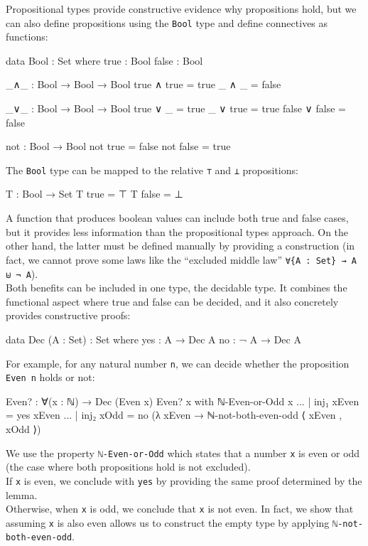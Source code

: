 Propositional types provide constructive evidence why propositions hold, but we can also define propositions using the \texttt{Bool} type and define connectives as functions:
\begin{agda}
data Bool : Set where
  true  : Bool
  false : Bool
  
_∧_ : Bool → Bool → Bool
true  ∧ true  = true
_     ∧ _     = false

_∨_ : Bool → Bool → Bool
true  ∨ _      = true
_     ∨ true   = true
false ∨ false  = false

not : Bool → Bool
not true  = false
not false = true
\end{agda}
The \texttt{Bool} type can be mapped to the relative \texttt{⊤} and \texttt{⊥} propositions:
\begin{agda}
T : Bool → Set
T true   =  ⊤
T false  =  ⊥
\end{agda}
A function that produces boolean values can include both true and false cases, but it provides less information than the propositional types approach. On the other hand, the latter must be defined manually by providing a construction (in fact, we cannot prove some laws like the ``excluded middle law'' \texttt{∀\{A : Set\} → A ⊎ ¬ A}).\\
Both benefits can be included in one type, the decidable type. It combines the functional aspect where true and false can be decided, and it also concretely provides constructive proofs:
\begin{agda}
data Dec (A : Set) : Set where
  yes :   A → Dec A
  no  : ¬ A → Dec A
\end{agda}
For example, for any natural number \texttt{n}, we can decide whether the proposition \texttt{Even n} holds or not:
\begin{agda}
Even? : ∀(x : ℕ) → Dec (Even x)
Even? x with ℕ-Even-or-Odd x
... | inj₁ xEven = yes xEven
... | inj₂ xOdd = no (λ xEven → ℕ-not-both-even-odd ⟨ xEven , xOdd ⟩)
\end{agda}

We use the property \texttt{ℕ-Even-or-Odd} which states that a number \texttt{x} is even or odd (the case where both propositions hold is not excluded).\\
If \texttt{x} is even, we conclude with \texttt{yes} by providing the same proof determined by the lemma.\\
Otherwise, when \texttt{x} is odd, we conclude that \texttt{x} is not even. In fact, we show that assuming \texttt{x} is also even allows us to construct the empty type by applying \texttt{ℕ-not-both-even-odd}.  


